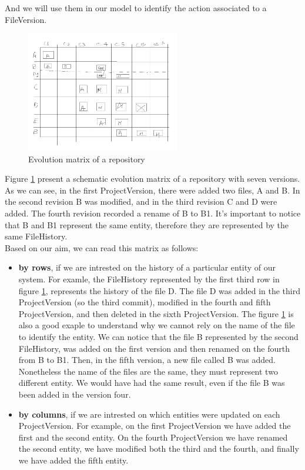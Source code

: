 And we will use them in our model to identify the action associated to a FileVersion. 
\begin{figure}
    \center
    \includegraphics[width=0.6\textwidth]{ApproachMatrix.jpg}
    \caption{Evolution matrix of a repository}
    \label{fig:evolutionMatrixApproach}
\end{figure}
Figure \ref{fig:evolutionMatrixApproach} present a schematic evolution matrix of a repository with seven versions.
As we can see, in the first ProjectVersion, there were added two files, A and B. In the second revision B was modified, and in the third revision C and D were added.
The fourth revision recorded a rename of B to B1.
It's important to notice that B and B1 represent the same entity, therefore they are represented by the same FileHistory.\\



Based on our aim, we can read this matrix as follows:
 \begin{itemize}
     \item \textbf{by rows}, if we are intrested on the history of a particular entity of our system. 
     For examle, the FileHistory represented by the first third row in figure \ref{fig:evolutionMatrixApproach}, represents the history of the file D. 
     The file D was added in the third ProjectVersion (so the third commit), modified in the fourth and fifth ProjectVersion, and then deleted in the sixth ProjectVersion.
     The figure \ref{fig:evolutionMatrixApproach} is also a good exaple to understand why we cannot rely on the name of the file to identify the entity. 
     We can notice that the file B represented by the second FileHistory, was added on the first version and then renamed on the fourth from B to B1. 
     Then, in the fifth version, a new file called B was added. Nonetheless the name of the files are the same, they must represent two different entity. 
     We would have had the same result, even if the file B was been added in the version four. 
     \item \textbf{by columns}, if we are intrested on which entities were updated on each ProjectVersion. 
    For example, on the first ProjectVersion we have added the first and the second entity. 
    On the fourth ProjectVersion we have renamed the second entity, we have modified both the third and the fourth, and finally we have added the fifth entity.
 \end{itemize}

